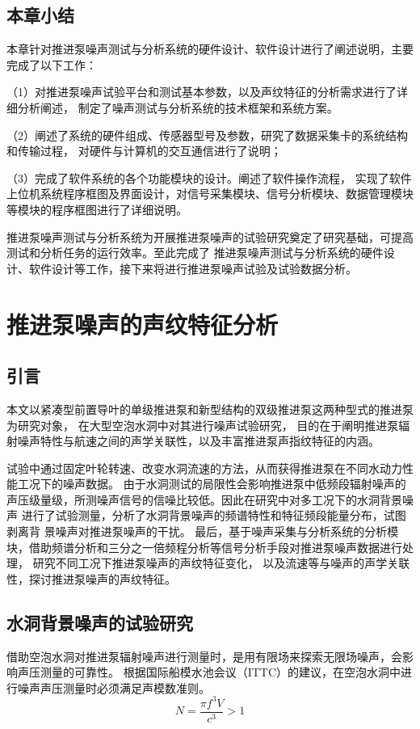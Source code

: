 \section{本章小结}
本章针对推进泵噪声测试与分析系统的硬件设计、软件设计进行了阐述说明，主要完成了以下工作：

（1）对推进泵噪声试验平台和测试基本参数，以及声纹特征的分析需求进行了详细分析阐述，
制定了噪声测试与分析系统的技术框架和系统方案。

（2）阐述了系统的硬件组成、传感器型号及参数，研究了数据采集卡的系统结构和传输过程，
对硬件与计算机的交互通信进行了说明；

（3）完成了软件系统的各个功能模块的设计。阐述了软件操作流程，
实现了软件上位机系统程序框图及界面设计，对信号采集模块、信号分析模块、数据管理模块等模块的程序框图进行了详细说明。

推进泵噪声测试与分析系统为开展推进泵噪声的试验研究奠定了研究基础，可提高测试和分析任务的运行效率。至此完成了
推进泵噪声测试与分析系统的硬件设计、软件设计等工作，接下来将进行推进泵噪声试验及试验数据分析。

\chapter{推进泵噪声的声纹特征分析}\label{ch:chapter3}
\section{引言}
本文以紧凑型前置导叶的单级推进泵和新型结构的双级推进泵这两种型式的推进泵为研究对象，
在大型空泡水洞中对其进行噪声试验研究，
目的在于阐明推进泵辐射噪声特性与航速之间的声学关联性，以及丰富推进泵声指纹特征的内涵。

试验中通过固定叶轮转速、改变水洞流速的方法，从而获得推进泵在不同水动力性能工况下的噪声数据。
由于水洞测试的局限性会影响推进泵中低频段辐射噪声的声压级量级，所测噪声信号的信噪比较低。因此在研究中对多工况下的水洞背景噪声
进行了试验测量，分析了水洞背景噪声的频谱特性和特征频段能量分布，试图剥离背
景噪声对推进泵噪声的干扰。
最后，基于噪声采集与分析系统的分析模块，借助频谱分析和三分之一倍频程分析等信号分析手段对推进泵噪声数据进行处理，
研究不同工况下推进泵噪声的声纹特征变化，
以及流速等与噪声的声学关联性，探讨推进泵噪声的声纹特征。
\section{水洞背景噪声的试验研究}
借助空泡水洞对推进泵辐射噪声进行测量时，是用有限场来探索无限场噪声，会影响声压测量的可靠性。
根据国际船模水池会议（ITTC）的建议，在空泡水洞中进行噪声声压测量时必须满足声模数准则\cite{曾赛2018试验研究}。
\begin{equation}
    \label{equ:fm}
    N=\frac{\pi f^3V}{c^3} > 1
\end{equation}

